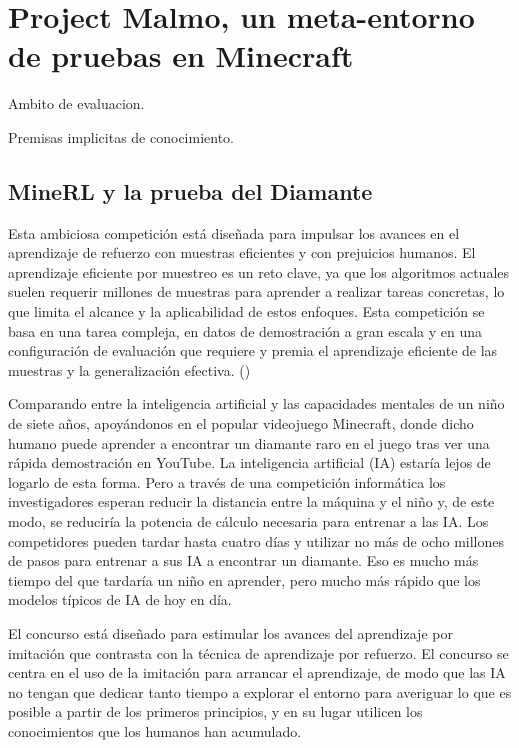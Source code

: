\section{Project Malmo, un meta-entorno de pruebas en Minecraft}\label{section:state-of-the-art:project-malmO}

Ambito de evaluacion.

Premisas implicitas de conocimiento.

\subsection{MineRL y la prueba del Diamante}

Esta ambiciosa competición está diseñada para impulsar los avances en el aprendizaje de refuerzo con muestras eficientes y con prejuicios humanos. El aprendizaje eficiente por muestreo es un reto clave, ya que los algoritmos actuales suelen requerir millones de muestras para aprender a realizar tareas concretas, lo que limita el alcance y la aplicabilidad de estos enfoques. Esta competición se basa en una tarea compleja, en datos de demostración a gran escala y en una configuración de evaluación que requiere y premia el aprendizaje eficiente de las muestras y la generalización efectiva. (\cite{hofmann2019minecraft})

Comparando entre la inteligencia artificial y las capacidades mentales de un niño de siete años, apoyándonos en el popular videojuego Minecraft, donde dicho humano puede aprender a encontrar un diamante raro en el juego tras ver una rápida demostración en YouTube. La inteligencia artificial (IA) estaría lejos de logarlo de esta forma. Pero a través de una competición informática los investigadores esperan reducir la distancia entre la máquina y el niño y, de este modo, se reduciría la potencia de cálculo necesaria para entrenar a las IA.
Los competidores pueden tardar hasta cuatro días y utilizar no más de ocho millones de pasos para entrenar a sus IA a encontrar un diamante. Eso es mucho más tiempo del que tardaría un niño en aprender, pero mucho más rápido que los modelos típicos de IA de hoy en día.

El concurso está diseñado para estimular los avances del aprendizaje por imitación que contrasta con la técnica de aprendizaje por refuerzo. El concurso se centra en el uso de la imitación para arrancar el aprendizaje, de modo que las IA no tengan que dedicar tanto tiempo a explorar el entorno para averiguar lo que es posible a partir de los primeros principios, y en su lugar utilicen los conocimientos que los humanos han acumulado. 

